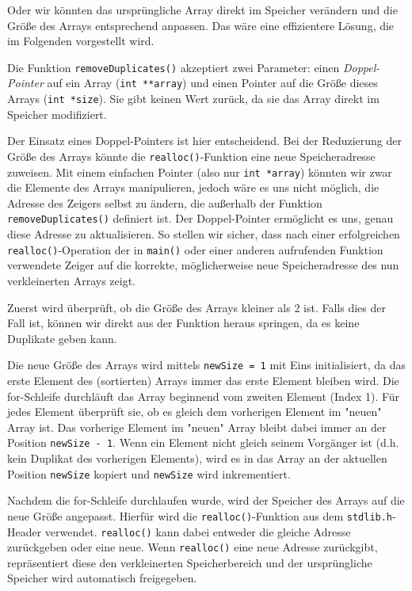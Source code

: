 Oder wir könnten das ursprüngliche Array direkt im Speicher verändern und die
Größe des Arrays entsprechend anpassen. Das wäre eine effizientere Lösung, die
im Folgenden vorgestellt wird.

Die Funktion \texttt{removeDuplicates()} akzeptiert zwei Parameter: einen
\textit{Doppel-Pointer} auf ein Array (\texttt{int **array}) und einen
Pointer auf die Größe dieses Arrays (\texttt{int *size}). Sie gibt keinen
Wert zurück, da sie das Array direkt im Speicher modifiziert.

Der Einsatz eines Doppel-Pointers ist hier entscheidend. Bei der Reduzierung der
Größe des Arrays könnte die \texttt{realloc()}-Funktion eine neue
Speicheradresse zuweisen. Mit einem einfachen Pointer (also nur
\texttt{int *array}) könnten wir zwar die Elemente des Arrays
manipulieren, jedoch wäre es uns nicht möglich, die Adresse des Zeigers selbst
zu ändern, die außerhalb der Funktion \texttt{removeDuplicates()}
definiert ist. Der Doppel-Pointer ermöglicht es uns, genau diese Adresse zu
aktualisieren. So stellen wir sicher, dass nach einer erfolgreichen
\texttt{realloc()}-Operation der in \texttt{main()} oder einer
anderen aufrufenden Funktion verwendete Zeiger auf die korrekte, möglicherweise
neue Speicheradresse des nun verkleinerten Arrays zeigt.

Zuerst wird überprüft, ob die Größe des Arrays kleiner als 2 ist. Falls dies der
Fall ist, können wir direkt aus der Funktion heraus springen, da es keine
Duplikate geben kann.

Die neue Größe des Arrays wird mittels \texttt{newSize = 1} mit Eins
initialisiert, da das erste Element des (sortierten) Arrays immer das erste
Element bleiben wird. Die for-Schleife durchläuft das Array beginnend vom
zweiten Element (Index 1). Für jedes Element überprüft sie, ob es gleich dem
vorherigen Element im "neuen" Array ist. Das vorherige Element im "neuen" Array
bleibt dabei immer an der Position \texttt{newSize - 1}. Wenn ein Element
nicht gleich seinem Vorgänger ist (d.h. kein Duplikat des vorherigen Elements),
wird es in das Array an der aktuellen Position \texttt{newSize} kopiert
und \texttt{newSize} wird inkrementiert.

Nachdem die for-Schleife durchlaufen wurde, wird der Speicher des Arrays auf die
neue Größe angepasst. Hierfür wird die \texttt{realloc()}-Funktion aus
dem \texttt{stdlib.h}-Header verwendet. \texttt{realloc()} kann
dabei entweder die gleiche Adresse zurückgeben oder eine neue. Wenn
\texttt{realloc()} eine neue Adresse zurückgibt, repräsentiert diese den
verkleinerten Speicherbereich und der ursprüngliche Speicher wird automatisch
freigegeben.

